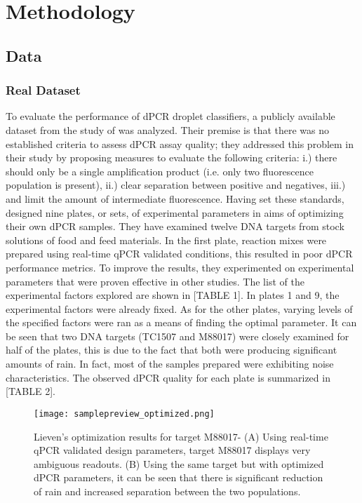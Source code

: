 \chapter{Methodology}
\label{sec:methodology} 

\section{Data}
\label{sec:data}

\subsection{Real Dataset}
\label{sec:ch4_realdata}
To evaluate the performance of dPCR droplet classifiers, a publicly available dataset from the study of  was analyzed. Their premise is that there was no established criteria to assess dPCR assay quality; they addressed this problem in their study by proposing measures to evaluate the following criteria: i.) there should only be a single amplification product (i.e. only two fluorescence population is present), ii.) clear separation between positive and negatives, iii.) and limit the amount of intermediate fluorescence. Having set these standards,  designed nine plates, or sets, of experimental parameters in aims of optimizing their own dPCR samples. They have examined twelve DNA targets from stock solutions of food and feed materials. In the first plate, reaction mixes were prepared using real-time qPCR validated conditions, this resulted in poor dPCR performance metrics. To improve the results, they experimented on experimental parameters that were proven effective in other studies. The list of the experimental factors explored are shown in [TABLE 1]. In plates 1 and 9, the experimental factors were already fixed. As for the other plates, varying levels of the specified factors were ran as a means of finding the optimal parameter. It can be seen that two DNA targets (TC1507 and M88017) were closely examined for half of the plates, this is due to the fact that both were producing significant amounts of rain. In fact, most of the samples prepared were exhibiting noise characteristics. The observed dPCR quality for each plate is summarized in [TABLE 2].  

\begin{figure}[h]
    \centering
    \texttt{[image: samplepreview\_optimized.png]}
    \caption[Lieven's optimization results for target M88017]%
    {Lieven's optimization results for target M88017- (A) Using real-time qPCR validated design parameters, target M88017 displays very ambiguous readouts. (B) Using the same target but with optimized dPCR parameters, it can be seen that there is significant reduction of rain and increased separation between the two populations.}
     \label{fig:samplepreview_optimized}
\end{figure}

